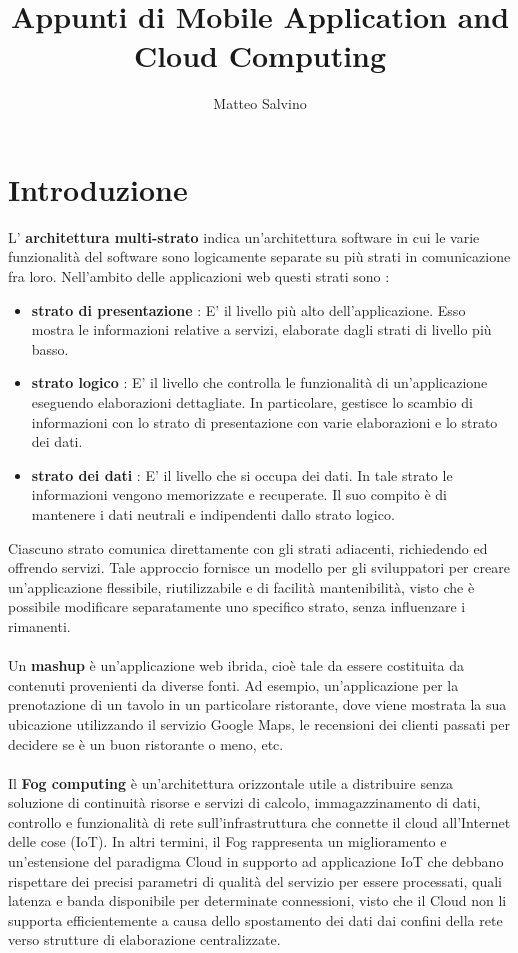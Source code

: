 \documentclass[12pt]{report}
\title{Appunti di Mobile Application and Cloud Computing}
\author{Matteo Salvino}
\date{}
\begin{document}
\maketitle
\tableofcontents
\pagebreak

\chapter{Introduzione}
L' \textbf{architettura multi-strato} indica un'architettura software in cui le varie funzionalità del software sono logicamente separate su più strati in comunicazione fra loro. Nell'ambito delle applicazioni web questi strati sono :
\begin{itemize}
\item \textbf{strato di presentazione} : E' il livello più alto dell'applicazione. Esso mostra le informazioni relative a servizi, elaborate dagli strati di livello più basso.
\item \textbf{strato logico} : E' il livello che controlla le funzionalità di un'applicazione eseguendo elaborazioni dettagliate. In particolare, gestisce lo scambio di informazioni con lo strato di presentazione con varie elaborazioni e lo strato dei dati.
\item \textbf{strato dei dati} : E' il livello che si occupa dei dati. In tale strato le informazioni vengono memorizzate e recuperate. Il suo compito è di mantenere i dati neutrali e indipendenti dallo strato logico.
\end{itemize}
Ciascuno strato comunica direttamente con gli strati adiacenti, richiedendo ed offrendo servizi. Tale approccio fornisce un modello per gli sviluppatori per creare un'applicazione flessibile, riutilizzabile e di facilità mantenibilità, visto che è possibile modificare separatamente uno specifico strato, senza influenzare i rimanenti.\\\\Un \textbf{mashup} è un'applicazione web ibrida, cioè tale da essere costituita da contenuti provenienti da diverse fonti. Ad esempio, un'applicazione per la prenotazione di un tavolo in un particolare ristorante, dove viene mostrata la sua ubicazione utilizzando il servizio Google Maps, le recensioni dei clienti passati per decidere se è un buon ristorante o meno, etc.\\\\Il \textbf{Fog computing} è un'architettura orizzontale utile a distribuire senza soluzione di continuità risorse e servizi di calcolo, immagazzinamento di dati, controllo e funzionalità di rete sull'infrastruttura che connette il cloud all'Internet delle cose (IoT). In altri termini, il Fog rappresenta un miglioramento e un'estensione del paradigma Cloud in supporto ad applicazione IoT che debbano rispettare dei precisi parametri di qualità del servizio per essere processati, quali latenza e banda disponibile per determinate connessioni, visto che il Cloud non li supporta efficientemente a causa dello spostamento dei dati dai confini della rete verso strutture di elaborazione centralizzate. 
\end{document}

